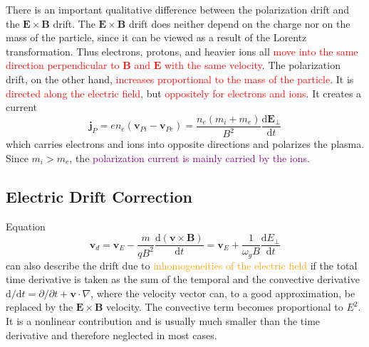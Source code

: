 \documentclass[12pt,a4paper]{article}
\renewcommand{\vec}[1]{\boldsymbol{#1}}
\newcommand{\dif}{\mathrm{d}}
\begin{document}
There is an important qualitative difference between the polarization drift and the $\vec{E} \times \vec{B}$ drift. The $\vec{E} \times \vec{B}$ drift does neither depend on the charge nor on the mass of the particle, since it can be viewed as a result of the Lorentz transformation. Thus electrons, protons, and heavier ions all \textcolor{red}{move into the same direction perpendicular to $\vec{B}$ and $\vec{E}$ with the same velocity}. The polarization drift, on the other hand, \textcolor{red}{increases proportional to the mass of the particle}. It is \textcolor{red}{directed along the electric field}, but \textcolor{red}{oppositely for electrons and ions}. It creates a current
\begin{equation}
\vec{j}_P = e n_e (\vec{v}_{Pi} -\vec{v}_{Pe}) = \frac{n_e(m_i +m_e)}{B^2} \dfrac{\dif \vec{E}_\perp}{\dif t}
\end{equation}
which carries electrons and ions into opposite directions and polarizes the plasma. Since $m_i > m_e$, the \textcolor{purple}{polarization current is mainly carried by the ions}.

\subsection{Electric Drift Correction}
\cite{1996bspp.book.....B} Equation
\begin{equation*}
\vec{v}_d = \vec{v}_E - \frac{m}{qB^2} \frac{\dif (\vec{v} \times \vec{B}) }{\dif t} = \vec{v}_E +\frac{1}{\omega_g B} \frac{\dif E_\perp}{\dif t}
\end{equation*}
can also describe the drift due to \textcolor{orange}{inhomogeneities of the electric field} if the total time derivative is taken as the sum of the temporal and the convective derivative $\dif /\dif t = \partial /\partial t +\vec{v} \cdot \nabla$, where the velocity vector can, to a good approximation, be replaced by the $\vec{E} \times \vec{B}$ velocity. The convective term becomes proportional to $E^2$. It is a nonlinear contribution and is usually much smaller than the time derivative and therefore neglected in most cases.
\end{document}
